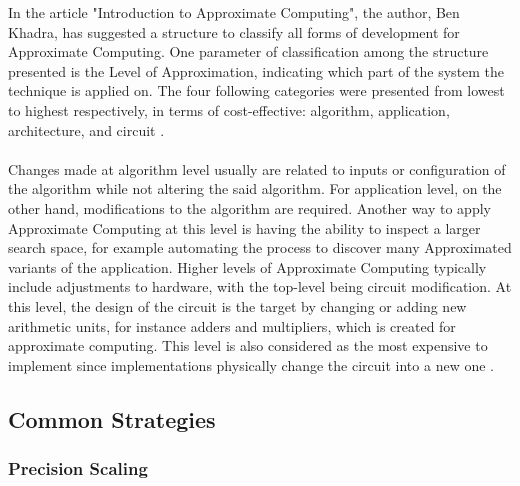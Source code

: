 In the article "Introduction to Approximate Computing", the author, Ben Khadra, has suggested a structure to classify all forms of development for Approximate Computing. One parameter of classification among the structure presented is the Level of Approximation, indicating which part of the system the technique is applied on. The four following categories were presented from lowest to highest respectively, in terms of cost-effective: algorithm, application, architecture, and circuit \cite{introAxC}. \\
~\\
Changes made at algorithm level usually are related to inputs or configuration of the algorithm while not altering the said algorithm. For application level, on the other hand, modifications to the algorithm are required. Another way to apply Approximate Computing at this level is having the ability to inspect a larger search space, for example automating the process to discover many Approximated variants of the application. Higher levels of Approximate Computing typically include adjustments to hardware, with the top-level being circuit modification. At this level, the design of the circuit is the target by changing or adding new arithmetic units, for instance adders and multipliers, which is created for approximate computing. This level is also considered as the most expensive to implement since implementations physically change the circuit into a new one \cite{introAxC}.

\subsection{Common Strategies}

\subsubsection{Precision Scaling}

